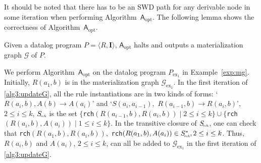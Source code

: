 It should be noted that there has to be an SWD path for any derivable node in some iteration when performing
Algorithm~$\mathsf{A}_{\text{opt}}$.
The following lemma shows the correctness of Algorithm~$\mathsf{A}_{\text{opt}}$.

\begin{lemma}\label{lemma:a3}
Given a datalog program $P=\langle R, \textbf{I}\rangle$,
$\mathsf{A}_{\text{opt}}$ halts and outputs a materialization graph $\mathcal{G}$ of $P$.
\end{lemma}

\begin{example}\label{exp:opt}
We perform Algorithm~$\mathsf{A}_{\text{opt}}$ on the datalog program $P_{\text{ex}_1}$ in Example~\ref{exp:mg}.
Initially, $R(a_1,b)$ is in the materialization graph $\mathcal{G}_{\text{ex}_1}$.
In the first iteration of \ref{alg3:updateG}, all the rule instantiations are in two kinds of forms:
`$R(a_i,b),A(b)\rightarrow A(a_i)$' and `$S(a_i,a_{i-1}),$ $R(a_{i-1},b)\rightarrow R(a_i,b)$', $2\leq i\leq k$,
$S_{\!\textit{\tiny rch}}$ is the set $\{$\texttt{rch}$(R(a_{i-1},b),
R(a_i,b)) \mid 2\leq i\leq k\}
\cup\{$\texttt{rch}$(R(a_i,b), A(a_i)) \mid 1\leq i\leq k\}$.
In the transitive closure of $S_{\!\textit{\tiny rch}}$,
one can check that \texttt{rch}$(R(a_1,b), R(a_i,b)),$
\texttt{rch}$(R(a_1,b), A(a_i))\in S^*_{\!\textit{\tiny rch}}, 2\leq i\leq k$.
Thus, $R(a_i,b)$ and $A(a_i)$, $2\leq i\leq k$, can all be added to
$\mathcal{G}_{\text{ex}_1}$
in the first iteration of \ref{alg3:updateG}.
\end{example}

